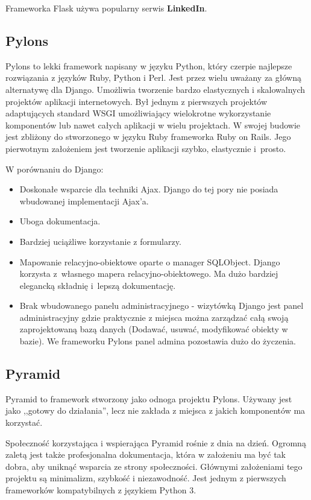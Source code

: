 \documentclass[]{mgr}
\begin{document}
            Frameworka Flask używa popularny serwis \textbf{LinkedIn}.

            \subsection{Pylons}
            Pylons to lekki framework napisany w języku Python, który czerpie najlepsze rozwiązania z języków Ruby, Python i Perl. Jest przez wielu uważany za główną alternatywę dla Django. Umożliwia tworzenie bardzo elastycznych i skalowalnych projektów aplikacji internetowych. Był jednym z pierwszych projektów adaptujących standard WSGI umożliwiający wielokrotne wykorzystanie komponentów lub nawet całych aplikacji w wielu projektach. W swojej budowie jest zbliżony do stworzonego w języku Ruby frameworka Ruby on Rails. Jego pierwotnym założeniem jest tworzenie aplikacji szybko, elastycznie i~prosto.

            W porównaniu do Django:
            \begin{itemize}
                \item Doskonałe wsparcie dla techniki Ajax. Django do tej pory nie posiada wbudowanej implementacji Ajax'a.
                \item Uboga dokumentacja.
                \item Bardziej uciążliwe korzystanie z formularzy.
                \item Mapowanie relacyjno-obiektowe oparte o manager SQLObject. Django korzysta z~własnego mapera relacyjno-obiektowego. Ma dużo bardziej elegancką składnię i~lepszą dokumentację.
                \item Brak wbudowanego panelu administracyjnego - wizytówką Django jest panel administracyjny gdzie praktycznie z miejsca można zarządzać całą swoją zaprojektowaną bazą danych (Dodawać, usuwać, modyfikować obiekty w bazie). We frameworku Pylons panel admina pozostawia dużo do życzenia.
            \end{itemize}

            \subsection{Pyramid}
            Pyramid to framework stworzony jako odnoga projektu Pylons. Używany jest jako ,,gotowy do działania'', lecz nie zakłada z miejsca z jakich komponentów ma korzystać.

            Społeczność korzystająca i wspierająca Pyramid rośnie z dnia na dzień. Ogromną zaletą jest także profesjonalna dokumentacja, która w założeniu ma być tak dobra, aby uniknąć wsparcia ze strony społeczności. Głównymi założeniami tego projektu są minimalizm, szybkość i niezawodność. Jest jednym z pierwszych frameworków kompatybilnych z językiem Python 3.
\end{document}
